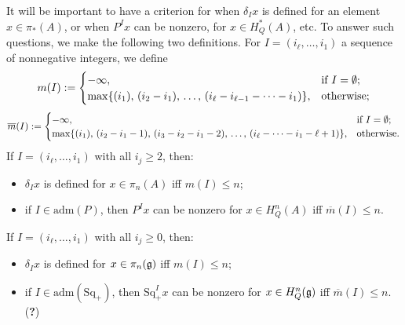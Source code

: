 \documentclass[10pt]{article}
\newcommand{\admis}[1]{\mathrm{adm}(#1)}%
\newcommand{\SqShift}{\Sq_{+}}
\newcommand{\Sq}{\mathrm{Sq}}
\newcommand{\minDim}{m}
\newcommand{\minDimP}{\overline{m}}
\begin{document}
\begin{SteenrodAlgebrasAndTheirKoszulDuals}
It will be important to have a criterion for when $\delta_Ix$ is defined for an element $x\in\pi_*(A)$, or when $P^Ix$ can be nonzero, for $x\in H^*_Q(A)$, etc.
To answer such questions, we make the following two definitions. For $I=(i_\ell,\ldots,i_1)$ a sequence of nonnegative integers, we define
\[\minDim(I):=\begin{cases}
-\infty,&\textup{if }I=\emptyset;\\
\max\{(i_1),\,(i_2-i_1),\,\ldots,\,(i_{\ell}-i_{\ell-1}-\cdots -i_1)\},&\textup{otherwise};
\end{cases}
\]
\[\minDimP(I):=\begin{cases}
-\infty,&\textup{if }I=\emptyset;\\
\max\{(i_1),\,(i_2-i_1-1),\,(i_3-i_2-i_1-2),\,\ldots,\,(i_{\ell}-\cdots-i_1-\ell+1)\},&\textup{otherwise}.
\end{cases}
\]
If $I=(i_{\ell},\ldots,i_1)$ with all $i_j\geq2$, then:
\begin{itemize}
\setlength{\parindent}{.25in}
\squishlist
\item $\delta_Ix$ is defined for $x\in \pi_n(A)$ iff $\minDim(I)\leq n$;
\item if $I\in\admis{P}$, then $P^Ix$ can be nonzero for $x\in H^n_Q(A)$ iff $\minDimP(I)\leq n$.
\end{itemize}
If $I=(i_{\ell},\ldots,i_1)$ with all $i_j\geq0$, then:
\begin{itemize}
\setlength{\parindent}{.25in}
\squishlist
\item $\delta_Ix$ is defined for $x\in \pi_n(\mathfrak{g})$ iff $\minDim(I)\leq n$;
\item if $I\in\admis{\SqShift}$, then $\SqShift^Ix$ can be nonzero for $x\in H^n_Q(\mathfrak{g})$ iff $\minDimP(I)\leq n$. (\textbf{?})
\end{itemize}


\end{SteenrodAlgebrasAndTheirKoszulDuals}
\end{document}
